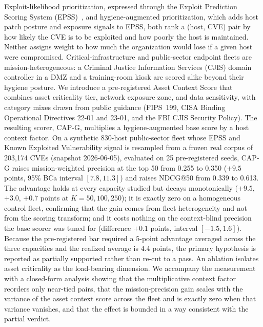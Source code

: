 Exploit-likelihood prioritization, expressed through the Exploit Prediction Scoring System
(EPSS)~\cite{jacobs2021epss}, and hygiene-augmented prioritization, which adds host patch
posture and exposure signals to EPSS, both rank a (host, CVE) pair by how likely the CVE is to
be exploited and how poorly the host is maintained. Neither assigns weight to how much the
organization would lose if a given host were compromised. Critical-infrastructure and
public-sector endpoint fleets are mission-heterogeneous: a Criminal Justice Information
Services (CJIS) domain controller in a DMZ and a training-room kiosk are scored alike
beyond their hygiene posture. We introduce a
pre-registered Asset Context Score that combines asset criticality tier, network exposure
zone, and data sensitivity, with category mixes drawn from public guidance (FIPS~199, CISA
Binding Operational Directives 22-01 and 23-01, and the FBI CJIS Security Policy). The
resulting scorer, CAP-G, multiplies a hygiene-augmented base score by a host context factor.
On a synthetic 830-host public-sector fleet whose EPSS and Known Exploited Vulnerability signal is
resampled from a frozen real corpus of 203{,}174 CVEs (snapshot 2026-06-05), evaluated on 25
pre-registered seeds, CAP-G raises mission-weighted precision at the top 50 from 0.255 to 0.350
($+9.5$ points, 95\% BCa interval $[7.8, 11.3]$) and raises NDCG@50 from 0.339 to 0.613. The
advantage holds at every capacity studied but decays monotonically ($+9.5$, $+3.0$, $+0.7$
points at $K = 50, 100, 250$); it is exactly zero on a homogeneous control fleet, confirming
that the gain comes from fleet heterogeneity and not from the scoring transform; and it costs
nothing on the context-blind precision the base scorer was tuned for (difference $+0.1$ points,
interval $[-1.5, 1.6]$). Because the pre-registered bar required a $5$-point advantage averaged
across the three capacities and the realized average is $4.4$ points, the primary hypothesis is
reported as partially supported rather than re-cut to a pass. An ablation isolates asset
criticality as the load-bearing dimension. We accompany the measurement with a
closed-form analysis showing that the multiplicative context factor reorders only
near-tied pairs, that the mission-precision gain scales with the variance of the
asset context score across the fleet and is exactly zero when that variance
vanishes, and that the effect is bounded in a way consistent with the partial
verdict.
